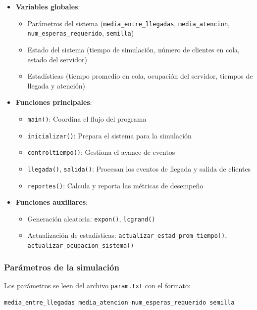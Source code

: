 \documentclass{article}
\begin{document}
\begin{itemize}
    \item \textbf{Variables globales}:
    \begin{itemize}
        \item Parámetros del sistema (\texttt{media\_entre\_llegadas}, \texttt{media\_atencion}, \texttt{num\_esperas\_requerido}, \texttt{semilla})
        \item Estado del sistema (tiempo de simulación, número de clientes en cola, estado del servidor)
        \item Estadísticas (tiempo promedio en cola, ocupación del servidor, tiempos de llegada y atención)
    \end{itemize}
    
    \item \textbf{Funciones principales}:
    \begin{itemize}
        \item \texttt{main()}: Coordina el flujo del programa
        \item \texttt{inicializar()}: Prepara el sistema para la simulación
        \item \texttt{controltiempo()}: Gestiona el avance de eventos
        \item \texttt{llegada()}, \texttt{salida()}: Procesan los eventos de llegada y salida de clientes
        \item \texttt{reportes()}: Calcula y reporta las métricas de desempeño
    \end{itemize}
    
    \item \textbf{Funciones auxiliares}:
    \begin{itemize}
        \item Generación aleatoria: \texttt{expon()}, \texttt{lcgrand()}
        \item Actualización de estadísticas: \texttt{actualizar\_estad\_prom\_tiempo()}, \texttt{actualizar\_ocupacion\_sistema()}
    \end{itemize}
\end{itemize}

\subsubsection{Parámetros de la simulación}

Los parámetros se leen del archivo \texttt{param.txt} con el formato:

\begin{verbatim}
media_entre_llegadas media_atencion num_esperas_requerido semilla
\end{verbatim}
\end{document}
